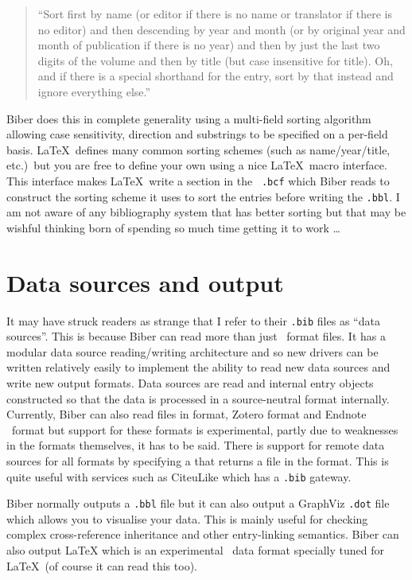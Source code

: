 \documentclass[final]{ltugboat}
\def\BibLaTeX{\Bib\LaTeX}
\begin{document}
\begin{quote}
 ``Sort first by name (or editor if there is no name or translator
 if there is no editor) and then descending by year and month (or by
 original year and month of publication if there is no year) and then by
 just the last two digits of the volume and then by title (but case
 insensitive for title). Oh, and if there is a special shorthand for the
 entry, sort by that instead and ignore everything else.''
\end{quote}

\noindent Biber does this in complete generality using a multi-field sorting algorithm
allowing case sensitivity, direction and substrings to be specified on a
per-field basis. \BibLaTeX\ defines many common sorting schemes (such as
name/year/title, etc.)\ but you are free to define your own using a nice
\LaTeX\ macro interface. This interface makes \BibLaTeX\ write a section in
the \XML\ \verb|.bcf| which Biber reads to construct the sorting scheme it
uses to sort the entries before writing the \verb|.bbl|. I am not aware of
any bibliography system that has better sorting but that may be wishful
thinking born of spending so much time getting it to work \ldots

\section{Data sources and output}

It may have struck readers as strange that I refer to their \verb|.bib| files
as ``data sources''. This is because Biber can read more than just \BibTeX\
format files. It has a modular data source reading/writing architecture and
so new drivers can be written relatively easily to implement the ability to
read new data sources and write new output formats. Data sources are read
and internal entry objects constructed so that the data is processed in a
source-neutral format internally. Currently, Biber can also read files in
\acro{RIS} format, Zotero \acro{XML/RDF} format and Endnote \XML\ format but support for
these formats is experimental, partly due to weaknesses in the formats
themselves, it has to be said. There is support for remote data sources for
all formats by specifying a \acro{URL} that returns a file in the format. This is
quite useful with services such as CiteuLike which has a \verb|.bib|
gateway.

Biber normally outputs a \verb|.bbl| file but it can also output a GraphViz
\verb|.dot| file which allows you to visualise your data. This is mainly
useful for checking complex cross-reference inheritance and other
entry-linking semantics. Biber can also output \BibLaTeX{} which is an
experimental \XML\ data format specially tuned for \BibLaTeX\ (of course it
can read this too).
\end{document}
